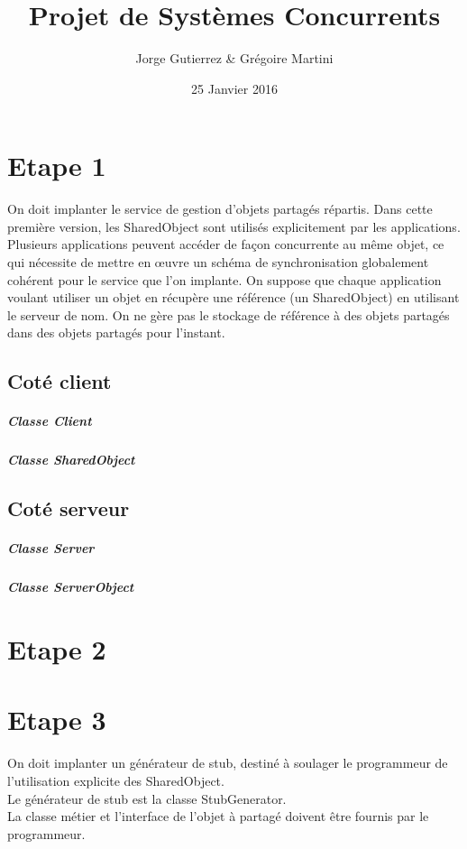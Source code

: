 \documentclass[a4paper,12pt]{article}
\title{Projet de Systèmes Concurrents}
\author{Jorge Gutierrez \& Grégoire Martini}
\date{25 Janvier 2016}
\begin{document}
\maketitle

\bigskip
\bigskip
\bigskip
\tableofcontents
\newpage


\section{Etape 1}

On doit implanter le service de gestion d'objets partagés répartis. Dans cette première version, les 
SharedObject sont utilisés explicitement par les applications. \\

Plusieurs applications peuvent accéder de façon concurrente au même objet, ce qui nécessite de mettre en 
œuvre un schéma de synchronisation globalement cohérent pour le service que l'on implante.
On suppose que chaque application voulant utiliser un objet en récupère une référence (un SharedObject) en 
utilisant le serveur de nom. On ne gère pas le stockage de référence à des objets partagés dans des objets partagés pour l'instant.

\subsection{Coté client}
\subparagraph{Classe Client}
\subparagraph{Classe SharedObject}

\subsection{Coté serveur}
\subparagraph{Classe Server}
\subparagraph{Classe ServerObject}


\clearpage
\section{Etape 2}

\clearpage
\section{Etape 3}

\bigskip
\bigskip
\bigskip

On doit  implanter un générateur de stub, destiné à soulager le programmeur de l'utilisation explicite des SharedObject. \\

Le générateur de stub est la classe StubGenerator.\\
La classe métier et l'interface de l'objet à partagé doivent être fournis par le programmeur.\\
\end{document}
